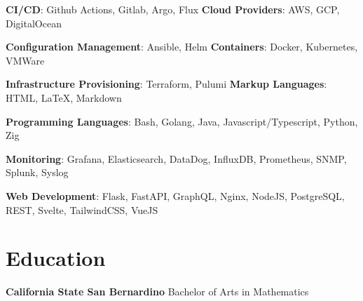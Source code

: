 \documentclass[letterpaper,11pt]{article}
\newcommand{\technicalSkill}[1]{
  \small{#1}
}
\begin{document}
  \technicalSkill{
    \textbf{CI/CD}{: Github Actions, Gitlab, Argo, Flux}
    \hfill
    \textbf{Cloud Providers}{: AWS, GCP, DigitalOcean}
  }

  \technicalSkill{
    \textbf{Configuration Management}{: Ansible, Helm}
    \hfill
    \textbf{Containers}{: Docker, Kubernetes, VMWare}
  }

  \technicalSkill{
    \textbf{Infrastructure Provisioning}{: Terraform, Pulumi}
    \hfill
    \textbf{Markup Languages}{: HTML, {\LaTeX}, Markdown}
  }

  \technicalSkill{
    \textbf{Programming Languages}{: Bash, Golang, Java, Javascript/Typescript, Python, Zig}
  }

  \technicalSkill{
    \textbf{Monitoring}{: Grafana, Elasticsearch, DataDog, InfluxDB, Prometheus, SNMP, Splunk, Syslog}
  }

  \technicalSkill{
    \textbf{Web Development}{: Flask, FastAPI, GraphQL, Nginx, NodeJS, PostgreSQL, REST, Svelte, TailwindCSS, VueJS}
  }

\section{Education}
  \technicalSkill
  {\textbf{California State San Bernardino}
  \hfill
  Bachelor of Arts in Mathematics}

\end{document}
